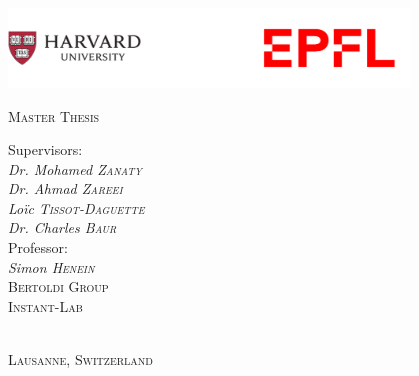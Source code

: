 \begin{titlepage}
    \makeatletter
	\centering

    \includegraphics[width=0.80\textwidth]{images/schools.png}
	
	\par\vspace{1cm}
	{\scshape\Large Master Thesis \par}
	\vspace{1.5cm}
	

	{\huge\bfseries \@title \par}
	\vspace{2cm}
	{\Large\itshape \@author \par}
	\vspace{1cm}
	{\Large Supervisors: \itshape \\ Dr. Mohamed \textsc{Zanaty} \\ Dr. Ahmad \textsc{Zareei} \\ Loïc \textsc{Tissot-Daguette} \\ Dr. Charles \textsc{Baur} \\}
	\vspace{1cm}
	{\Large Professor: \\ \itshape Simon \textsc{Henein} \\}
	\vspace{1cm}
	{\Large \textsc{Bertoldi Group \\ Instant-Lab}}
	
	\par
	\vfill
	{\scshape\large\@date}\\
	{\scshape\large Lausanne, Switzerland}


\end{titlepage}


